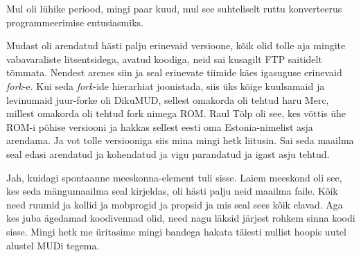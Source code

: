 
Mul oli lühike periood, mingi paar kuud, mul see suhteliselt ruttu konverteerus 
programmeerimise entusiasmiks. 


Mudast oli arendatud hästi palju erinevaid versioone, kõik 
olid tolle aja mingite vabavaraliste litsentsidega, avatud koodiga, neid sai 
kusagilt FTP saitidelt tõmmata. Nendest arenes siin ja seal erinevate tiimide 
käes igasuguse erinevaid \emph{fork}-e. Kui seda \emph{fork}-ide hierarhiat 
joonistada, siis üks kõige kuulsamaid ja levinumaid juur-forke oli 
DikuMUD, sellest omakorda oli tehtud haru Merc, 
millest omakorda oli tehtud fork nimega ROM. Raul Tölp 
oli see, kes võttis ühe ROM-i põhise  versiooni ja hakkas sellest eesti 
oma  Estonia-nimelist asja arendama. Ja vot tolle versiooniga siis mina mingi 
hetk liitusin. Sai seda maailma seal edasi arendatud ja kohendatud ja vigu 
parandatud ja igast asju tehtud. 


Jah, kuidagi spontaanne meeskonna-element tuli sisse. Laiem meeskond oli see, 
kes seda mängumaailma seal kirjeldas, oli hästi palju neid maailma faile. Kõik 
need ruumid ja kollid ja mobprogid ja propsid ja mis seal sees kõik elavad. Aga kes juba 
ägedamad koodivennad olid, need nagu läksid  järjest rohkem sinna koodi 
sisse. Mingi hetk me üritasime mingi bandega  hakata täiesti nullist 
hoopis uutel alustel MUDi tegema. 

